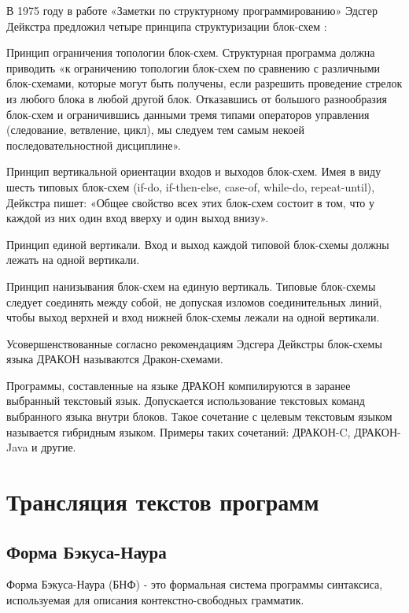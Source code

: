 В 1975 году в работе «Заметки по структурному программированию» Эдсгер Дейкстра предложил четыре принципа структуризации блок-схем \cite{deixtra}:
\begin{enumerate*}
	\item Принцип ограничения топологии блок-схем. Структурная программа должна приводить «к ограничению топологии блок-схем по сравнению с различными блок-схемами, которые могут быть получены, если разрешить проведение стрелок из любого блока в любой другой блок. Отказавшись от большого разнообразия блок-схем и ограничившись данными тремя типами операторов управления (следование, ветвление, цикл), мы следуем тем самым некоей последовательностной дисциплине».
	\item Принцип вертикальной ориентации входов и выходов блок-схем. Имея в виду шесть типовых блок-схем (if-do, if-then-else, case-of, while-do, repeat-until), Дейкстра пишет: «Общее свойство всех этих блок-схем состоит в том, что у каждой из них один вход вверху и один выход внизу».
	\item Принцип единой вертикали. Вход и выход каждой типовой блок-схемы должны лежать на одной вертикали.
	\item Принцип нанизывания блок-схем на единую вертикаль. Типовые блок-схемы следует соединять между собой, не допуская изломов соединительных линий, чтобы выход верхней и вход нижней блок-схемы лежали на одной вертикали.
\end{enumerate*}

Усовершенствованные согласно рекомендациям Эдсгера Дейкстры блок-схемы языка ДРАКОН называются Дракон-схемами.

Программы, составленные на языке ДРАКОН компилируются в заранее выбранный текстовый язык. Допускается использование текстовых команд выбранного языка внутри блоков. Такое сочетание с целевым текстовым языком называется гибридным языком. Примеры таких сочетаний: ДРАКОН-C, ДРАКОН-Java и другие.

\section{Трансляция текстов программ}
\subsection{Форма Бэкуса-Наура}

Форма Бэкуса-Наура (БНФ) - это формальная система программы синтаксиса, используемая для описания контекстно-свободных грамматик.

